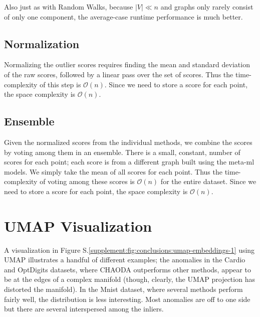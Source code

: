 \documentclass{article}
\begin{document}
Also just as with Random Walks, because $|V| \ll n$ and graphs only rarely consist of only one component, the average-case runtime performance is much better.

\subsection{Normalization}

Normalizing the outlier scores requires finding the mean and standard deviation of the raw scores, followed by a linear pass over the set of scores.
Thus the time-complexity of this step is $\mathcal{O}(n)$.
Since we need to store a score for each point, the space complexity is $\mathcal{O}(n)$.

\subsection{Ensemble}

Given the normalized scores from the individual methods, we combine the scores by voting among them in an ensemble.
There is a small, constant, number of scores for each point; each score is from a different graph built using the meta-ml models.
We simply take the mean of all scores for each point.
Thus the time-complexity of voting among these scores is $\mathcal{O}(n)$ for the entire dataset.
Since we need to store a score for each point, the space complexity is $\mathcal{O}(n)$.


\section{UMAP Visualization}
\label{supplement:sec:umap-visualization}


A visualization in Figure S.\ref{supplement:fig:conclusions:umap-embeddings-1} using UMAP illustrates a handful of different examples;
the anomalies in the Cardio and OptDigits datasets, where CHAODA outperforms other methods, appear to be at the edges of a complex manifold (though, clearly, the UMAP projection has distorted the manifold).
In the Mnist dataset, where several methods perform fairly well, the distribution is less interesting.
Most anomalies are off to one side but there are several interspersed among the inliers.
\end{document}
